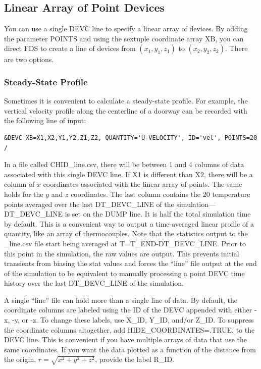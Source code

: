 \documentclass[11pt]{book}
\begin{document}
\subsection{Linear Array of Point Devices}
\label{info:line_file}

You can use a single {\ct DEVC} line to specify a linear array of devices. By adding the parameter {\ct POINTS} and using the sextuple coordinate array {\ct XB}, you can direct FDS to create a line of devices from $(x_1,y_1,z_1)$ to $(x_2,y_2,z_2)$. There are two options.

\subsubsection{Steady-State Profile}

Sometimes it is convenient to calculate a steady-state profile. For example, the vertical velocity profile along the centerline of a doorway can be recorded with the following line of input:
\begin{lstlisting}
&DEVC XB=X1,X2,Y1,Y2,Z1,Z2, QUANTITY='U-VELOCITY', ID='vel', POINTS=20 /
\end{lstlisting}
In a file called {\ct CHID\_line.csv}, there will be between 1 and 4 columns of data associated with this single {\ct DEVC} line. If {\ct X1} is different than {\ct X2}, there will be a column of $x$ coordinates associated with the linear array of points. The same holds for the $y$ and $z$ coordinates. The last column contains the 20 temperature points averaged over the last {\ct DT\_DEVC\_LINE} of the simulation---{\ct DT\_DEVC\_LINE} is set on the {\ct DUMP} line.  It is half the total simulation time by default. This is a convenient way to output a time-averaged linear profile of a quantity, like an array of thermocouples.  Note that the statistics output to the {\ct \_line.csv} file start being averaged at {\ct T=T\_END-DT\_DEVC\_LINE}.  Prior to this point in the simulation, the raw values are output.  This prevents initial transients from biasing the stat values and forces the ``line'' file output at the end of the simulation to be equivalent to manually processing a point {\ct DEVC} time history over the last {\ct DT\_DEVC\_LINE} of the simulation.

A single ``line'' file can hold more than a single line of data. By default, the coordinate columns are labeled using the {\ct ID} of the {\ct DEVC} appended with either {\ct -x}, {\ct -y}, or {\ct -z}. To change these labels, use {\ct X\_ID}, {\ct Y\_ID}, and/or {\ct Z\_ID}. To suppress the coordinate columns altogether, add {\ct HIDE\_COORDINATES=.TRUE.} to the {\ct DEVC} line. This is convenient if you have multiple arrays of data that use the same coordinates. If you want the data plotted as a function of the distance from the origin, $r=\sqrt{x^2+y^2+z^2}$, provide the label {\ct R\_ID}.
\end{document}
